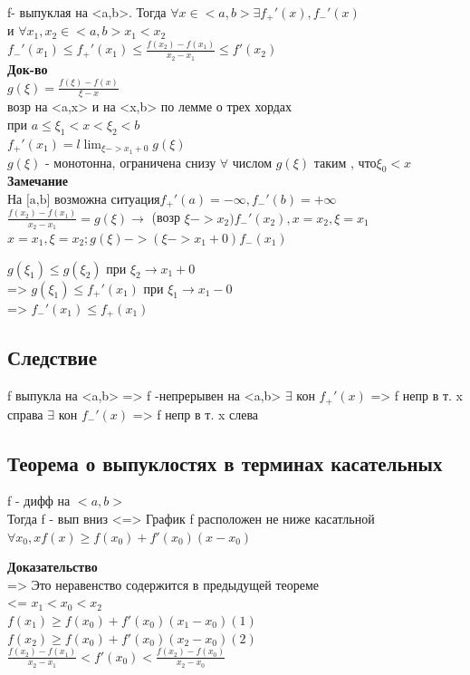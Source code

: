 \documentclass[12pt, a4paper]{article}
\newcommand{\nl}{\newline}
\begin{document}
	f- выпуклая на <a,b>. Тогда $\forall x \in <a,b> \exists f_{+}'(x) , f_{-}'(x)$ \\
	и $\forall x_{1}, x_{2} \in <a,b> x_{1}<x_{2}$ \\
	$f_{-}'(x_{1}) \leq f_{+}'(x_{1}) \leq \frac{f(x_2)-f(x_1)}{x_2-x_1}\leq f'(x_2)$ \\
	\textbf{Док-во} \\
	$g(\xi)=\frac{f(\xi)-f(x)}{\xi-x}$ \\ возр на <a,x> и на <x,b>  по лемме о трех хордах \\
	при $a\leq\xi_{1} < x<\xi_{2} < b $\\
	$ f_{+}'(x_{1})=l\lim_{\xi -> x_{1}+0}g(\xi) $\\
	$g(\xi)$ - монотонна, ограничена снизу  $\forall$ числом $g(\xi)$ таким , что$ \xi_0<x$ \\
	\textbf{Замечание} \\
	$ \text{На [a,b] возможна ситуация}  f_{+}'(a)= -\infty, f_{-}'(b)=+\infty$ \\
	$ \frac{f(x_2)-f(x_1)}{x_2-x_1} =g(\xi) \rightarrow $ (возр $ \xi -> x_{2}) f_{-}'(x_{2}) , x=x_{2}, \xi=x_{1} $\\
	$x=x_1, \xi=x_2 ; g(\xi) ->(\xi -> x_1 + 0) f_-(x_1)$ \nl
	
	$g(\xi_{1}) \leq g(\xi_{2})$ при $\xi_{2} \rightarrow x_1 + 0$ \\
	=> $g(\xi_{1}) \leq f_{+}'(x_{1})$ при $\xi_1 \rightarrow x_1 - 0$ \\
	=> $f_{-}'(x_1)  \leq f_{+}(x_{1})$  \\
	
	\subsection{Следствие} 
	f выпукла на <a,b> => f -непрерывен на <a,b> \nl
	$\exists$ кон  $f_{+}'(x)$ => f непр в т. x справа \nl
	$\exists$ кон  $f_{-}'(x)$ => f непр в т. x слева \nl
	
	\subsection{Теорема о выпуклостях в терминах касательных}
	f - дифф на $<a,b>$ 	\\
	Тогда f - вып вниз <=> График  f расположен не ниже касатльной \\
	$\forall x_{0},x f(x) \geq f(x_{0}) +f'(x_{0})(x-x_{0})$ \nl
	
	\textbf{Доказательство} \\
	=> Это неравенство содержится в предыдущей теореме \\
	<= $x_{1}< x_{0} < x_{2}$ \\
	$ f(x_{1})\geq f(x_{0})+f'(x_{0})(x_{1}-x_{0}) (1)$ \\
	$f(x_{2})\geq f(x_{0})+f'(x_{0})(x_{2}-x_{0}) (2)$ \\
	$\frac{f(x_2)-f(x_1)}{x_2-x_1} <f'(x_0)<\frac{f(x_2)-f(x_0)}{x_2-x_0}$   \\
	
\end{document}
